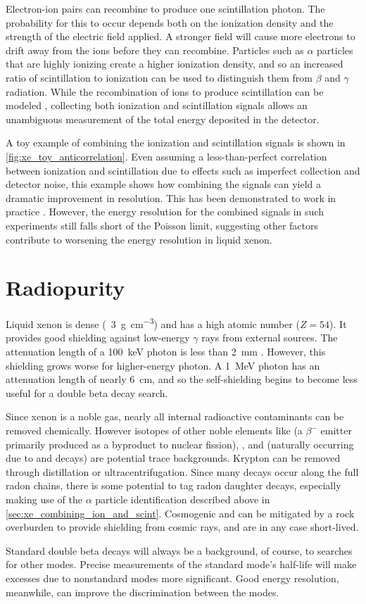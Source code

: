 \documentclass[herrin-thesis.tex]{subfiles}
\begin{document}
Electron-ion pairs can recombine to produce one scintillation photon. The probability for this to occur depends both on the ionization density and the strength of the electric field applied. A stronger field will cause more electrons to drift away from the ions before they can recombine. Particles such as \(\alpha\) particles that are highly ionizing create a higher ionization density, and so an increased ratio of scintillation to ionization can be used to distinguish them from \(\beta\) and \(\gamma\) radiation. While the recombination of ions to produce scintillation can be modeled \cite{Doke:1988qf,Thomas:1987ve}, collecting both ionization and scintillation signals allows an unambiguous measurement of the total energy deposited in the detector.

A toy example of combining the ionization and scintillation signals is shown in \cref{fig:xe_toy_anticorrelation}. Even assuming a less-than-perfect correlation between ionization and scintillation due to effects such as imperfect collection and detector noise, this example shows how combining the signals can yield a dramatic improvement in resolution. This has been demonstrated to work in practice \cite{Conti:2003tg,Aprile:2007hc}. However, the energy resolution for the combined signals in such experiments still falls short of the Poisson limit, suggesting other factors contribute to worsening the energy resolution in liquid xenon.

\section{Radiopurity}
Liquid xenon is dense (\about~\SI{3}{\g\per\cubic\cm}) and has a high atomic number (\(Z=54\)). It provides good shielding against low-energy \(\gamma\) rays from external sources. The attenuation length of a \SI{100}{keV} photon is less than \SI{2}{\mm} \cite{Berger:2010dq}. However, this shielding grows worse for higher-energy photon. A \SI{1}{MeV} photon has an attenuation length of nearly \SI{6}{\cm}, and so the self-shielding begins to become less useful for a double beta decay search.

Since xenon is a noble gas, nearly all internal radioactive contaminants can be removed chemically. However isotopes of other noble elements like  (a \(\beta^{-}\) emitter primarily produced as a byproduct to nuclear fission), , and  (naturally occurring due to  and  decays) are potential trace backgrounds. Krypton can be removed through distillation or ultracentrifugation. Since many decays occur along the full radon chains, there is some potential to tag radon daughter decays, especially making use of the \(\alpha\) particle identification described above in \cref{sec:xe_combining_ion_and_scint}. Cosmogenic  and  can be mitigated by a rock overburden to provide shielding from cosmic rays, and are in any case short-lived.

Standard double beta decays will always be a background, of course, to searches for other modes. Precise measurements of the standard mode's half-life will make excesses due to nonstandard modes more significant. Good energy resolution, meanwhile, can improve the discrimination between the modes.
\end{document}
